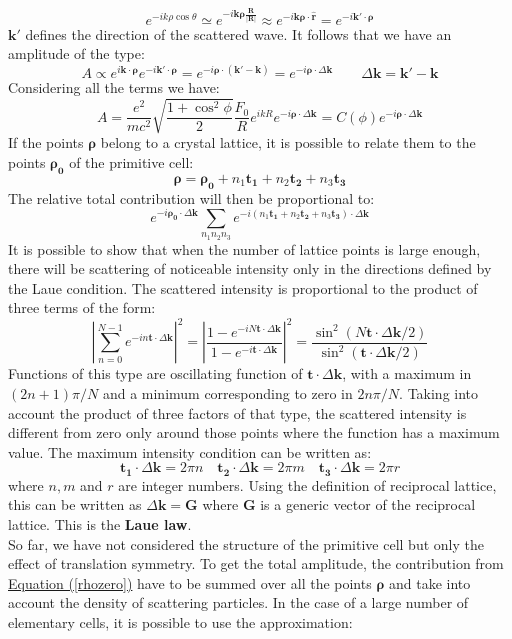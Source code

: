 \documentclass[10.75pt,a4paper,openright,bottom=2cm]{article}
\renewcommand{\Vec}[1]{\boldsymbol{#1}}
\begin{document}
\[
e^{-ik\rho\cos\theta}\simeq e^{-i\Vec{k}\Vec{\rho}\frac{\Vec{R}}{|\Vec{R}|}}\approx e^{-i\Vec{k}\Vec{\rho}\cdot\Vec{\hat{r}}}=e^{-i\Vec{k'}\cdot\Vec{\rho}}
\]
$\Vec{k'}$ defines the direction of the scattered wave. It follows that we have an amplitude of the type:
\[
A\propto e^{i\Vec{k}\cdot\Vec{\rho}}e^{-i\Vec{k}'\cdot\Vec{\rho}}=e^{-i\Vec{\rho}\cdot(\Vec{k}'-\Vec{k})}=e^{-i\Vec{\rho}\cdot\Delta\Vec{k}} \qquad \Delta\Vec{k}=\Vec{k}'-\Vec{k}
\]
Considering all the terms we have:
\[
A=\frac{e^2}{mc^2}\sqrt{\frac{1+\cos^2\phi}{2}}\frac{F_0}{R}e^{ikR}e^{-i\Vec{\rho}\cdot\Delta\Vec{k}}=C(\phi)e^{-i\Vec{\rho}\cdot\Delta\Vec{k}}
\]
If the points $\Vec{\rho}$ belong to a crystal lattice, it is possible to relate them to the points $\Vec{\rho_0}$ of the primitive cell:
\[
\Vec{\rho}=\Vec{\rho_0}+n_1\Vec{t_1}+n_2\Vec{t_2}+n_3\Vec{t_3}
\]
The relative total contribution will then be proportional to:
\begin{equation}
\label{rhozero}
e^{-i\Vec{\rho_0}\cdot\Delta\Vec{k}}\sum_{n_1n_2n_3}e^{-i(n_1\Vec{t_1}+n_2\Vec{t_2}+n_3\Vec{t_3})\cdot\Delta\Vec{k}}
\end{equation}
It is possible to show that when the number of lattice points is large enough, there will be scattering of noticeable intensity only in the directions defined by the Laue condition. The scattered intensity is proportional to the product of three terms of the form:
\[
\left|\sum_{n=0}^{N-1}e^{-in\Vec{t}\cdot\Delta\Vec{k}}\right|^2=\left|\frac{1-e^{-iN\Vec{t}\cdot\Delta\Vec{k}}}{1-e^{-i\Vec{t}\cdot\Delta\Vec{k}}}\right|^2=\frac{\sin^2(N\Vec{t}\cdot\Delta\Vec{k}/2)}{\sin^2(\Vec{t}\cdot\Delta\Vec{k}/2)}
\]
Functions of this type are oscillating function of $\Vec{t}\cdot\Delta\Vec{k}$, with a maximum in $(2n+1)\pi/N$ and a minimum corresponding to zero in $2n\pi/N$. Taking into account the product of three factors of that type, the scattered intensity is different from zero only around those points where the function has a maximum value. The maximum intensity condition can be written as:
\[
\Vec{t_1}\cdot\Delta\Vec{k}=2\pi n \quad \Vec{t_2}\cdot\Delta\Vec{k}=2\pi m \quad \Vec{t_3}\cdot\Delta\Vec{k}=2\pi r
\]
where $n,m$ and $r$ are integer numbers. Using the definition of reciprocal lattice, this can be written as $\Delta\Vec{k}=\Vec{G}$ where $\Vec{G}$ is a generic vector of the reciprocal lattice. This is the \textbf{Laue law}.\\
So far, we have not considered the structure of the primitive cell but only the effect of translation symmetry. To get the total amplitude, the contribution from \hyperref[rhozero]{Equation (\ref{rhozero})} have to be summed over all the points $\Vec{\rho}$ and take into account the density of scattering particles. In the case of a large number of elementary cells, it is possible to use the approximation:
\end{document}
